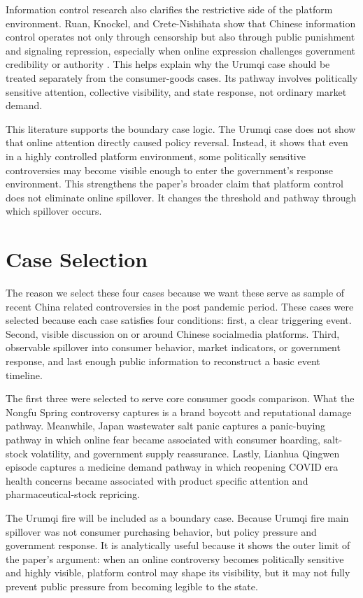 \documentclass[conference]{IEEEtran}
\begin{document}
Information control research also clarifies the restrictive side of the platform environment. Ruan, Knockel, and Crete-Nishihata show that Chinese information control operates not only through censorship but also through public punishment and signaling repression, especially when online expression challenges government credibility or authority \cite{ruan2021punishment}. This helps explain why the Urumqi case should be treated separately from the consumer-goods cases. Its pathway involves politically sensitive attention, collective visibility, and state response, not ordinary market demand.

This literature supports the boundary case logic. The Urumqi case does not show that online attention directly caused policy reversal. Instead, it shows that even in a highly controlled platform environment, some politically sensitive controversies may become visible enough to enter the government's response environment. This strengthens the paper's broader claim that platform control does not eliminate online spillover. It changes the threshold and pathway through which spillover occurs.

\section{Case Selection}
The reason we select these four cases because we want these serve as sample of recent China related controversies in the post pandemic period. These cases were selected because each case satisfies four conditions: first, a clear triggering event. Second, visible discussion on or around Chinese socialmedia platforms. Third, observable spillover into consumer behavior, market indicators, or government response, and last enough public information to reconstruct a basic event timeline.

The first three were selected to serve core consumer goods comparison. What the Nongfu Spring controversy captures is a brand boycott and reputational damage pathway. Meanwhile, Japan wastewater salt panic captures a panic-buying pathway in which online fear became associated with consumer hoarding, salt-stock volatility, and government supply reassurance. Lastly, Lianhua Qingwen episode captures a medicine demand pathway in which reopening COVID era health concerns became associated with product specific attention and pharmaceutical-stock repricing.

The Urumqi fire will be included as a boundary case. Because Urumqi fire main spillover was not consumer purchasing behavior, but policy pressure and government response. It is analytically useful because it shows the outer limit of the paper's argument: when an online controversy becomes politically sensitive and highly visible, platform control may shape its visibility, but it may not fully prevent public pressure from becoming legible to the state.
\end{document}
